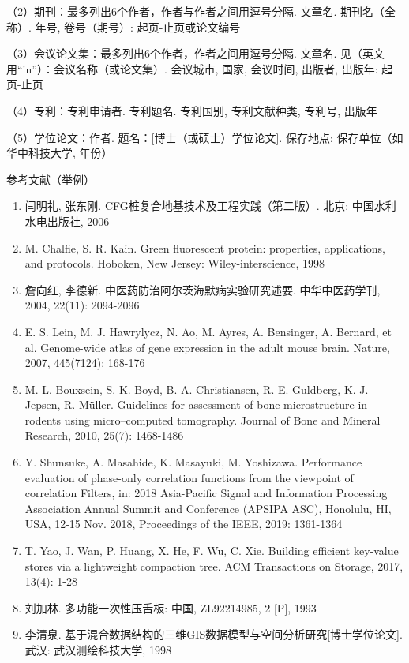 （2）期刊：最多列出6个作者，作者与作者之间用逗号分隔. 文章名. 期刊名（全称）. 年号, 卷号（期号）: 起页-止页或论文编号

（3）会议论文集：最多列出6个作者，作者之间用逗号分隔. 文章名. 见（英文用“in”）：会议名称（或论文集）. 会议城市, 国家, 会议时间, 出版者, 出版年: 起页-止页

（4）专利：专利申请者. 专利题名. 专利国别, 专利文献种类, 专利号, 出版年

（5）学位论文：作者. 题名：[博士（或硕士）学位论文]. 保存地点: 保存单位（如华中科技大学, 年份）

参考文献（举例）
\begin{enumerate}
  \renewcommand{\labelenumi}{[\theenumi]}
  \item	闫明礼, 张东刚. CFG桩复合地基技术及工程实践（第二版）. 北京: 中国水利水电出版社, 2006

  \item	M. Chalfie, S. R. Kain. Green fluorescent protein: properties, applications, and protocols. Hoboken, New Jersey: Wiley-interscience, 1998

  \item	詹向红, 李德新. 中医药防治阿尔茨海默病实验研究述要. 中华中医药学刊, 2004, 22(11): 2094-2096

  \item	E. S. Lein, M. J. Hawrylycz, N. Ao, M. Ayres, A. Bensinger, A. Bernard, et al. Genome-wide atlas of gene expression in the adult mouse brain. Nature, 2007, 445(7124): 168-176

  \item	M. L. Bouxsein, S. K. Boyd, B. A. Christiansen, R. E. Guldberg, K. J. Jepsen, R. Müller. Guidelines for assessment of bone microstructure in rodents using micro–computed tomography. Journal of Bone and Mineral Research, 2010, 25(7): 1468-1486

  \item	Y. Shunsuke, A. Masahide, K. Masayuki, M. Yoshizawa. Performance evaluation of phase-only correlation functions from the viewpoint of correlation Filters, in: 2018 Asia-Pacific Signal and Information Processing Association Annual Summit and Conference (APSIPA ASC), Honolulu, HI, USA, 12-15 Nov. 2018, Proceedings of the IEEE, 2019: 1361-1364

  \item	T. Yao, J. Wan, P. Huang, X. He, F. Wu, C. Xie. Building efficient key-value stores via a lightweight compaction tree. ACM Transactions on Storage, 2017, 13(4): 1-28

  \item	刘加林. 多功能一次性压舌板: 中国, ZL92214985, 2 [P], 1993

  \item	李清泉. 基于混合数据结构的三维GIS数据模型与空间分析研究[博士学位论文]. 武汉: 武汉测绘科技大学, 1998

\end{enumerate}

